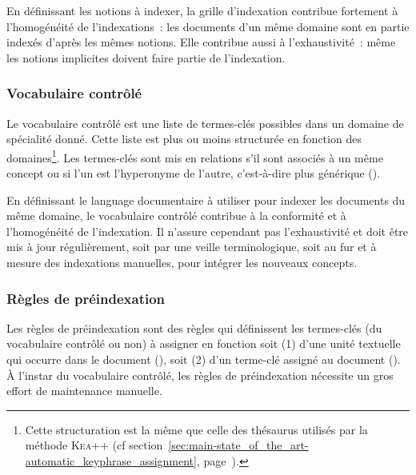         En définissant les notions à indexer, la grille d'indexation contribue
        fortement à l'homogénéité de l'indexations~: les documents d'un même
        domaine sont en partie indexés d'après les mêmes notions. Elle contribue
        aussi à l'exhaustivité~: même les notions implicites doivent faire
        partie de l'indexation.

      \subsubsection{Vocabulaire contrôlé}
      \label{subsubsec:main-domain_specific_keyphrase_annotation-manual_keyphrase_annotation-resources-controlled_vocabulary}
        Le vocabulaire contrôlé est une liste de termes-clés possibles dans un
        domaine de spécialité donné. Cette liste est plus ou moins structurée en
        fonction des domaines\footnote{Cette structuration est la même que celle
        des thésaurus utilisés par la méthode \textsc{Kea++} (cf
        section~\ref{sec:main-state_of_the_art-automatic_keyphrase_assignment},
        page~\pageref{sec:main-state_of_the_art-automatic_keyphrase_assignment}).}.
        Les termes-clés sont mis en relations s'il sont associés à un même
        concept ou si l'un est l'hyperonyme de l'autre, c'est-à-dire plus 
        générique ().
        
        En définissant le language documentaire à utiliser pour indexer les
        documents du même domaine, le vocabulaire contrôlé contribue à la
        conformité et à l'homogénéité de l'indexation. Il n'assure cependant pas
        l'exhaustivité et doit être mis à jour régulièrement, soit par une
        veille terminologique, soit au fur et à mesure des indexations
        manuelles, pour intégrer les nouveaux concepts.

      \subsubsection{Règles de préindexation}
      \label{subsubsec:main-domain_specific_keyphrase_annotation-manual_keyphrase_annotation-resources-preindexing_rules}
        Les règles de préindexation sont des règles qui définissent les
        termes-clés (du vocabulaire contrôlé ou non) à assigner en fonction soit
        (1) d'une unité textuelle qui occurre dans le document (),
        soit (2) d'un terme-clé assigné au document (). À l'instar
        du vocabulaire contrôlé, les règles de préindexation nécessite un gros
        effort de maintenance manuelle.
        

